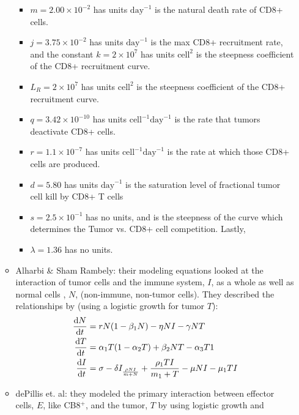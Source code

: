 \documentclass[11pt]{amsart}
\begin{document}
\begin{itemize}
\begin{itemize}
\begin{itemize}
                   		 	\item $m = 2.00 \times 10^{-2}$ has units $\text{day}^{-1}$ is the natural death rate of CD8+ cells.
                   		 	\item $j = 3.75 \times 10^{-2}$ has units $\text{day}^{-1}$ is the max CD8+ recruitment rate, and the constant $k = 2 \times 10^7$ has units $\text{cell}^2$ is the steepness coefficient of the CD8+ recruitment curve.
                   		 	\item $L_R = 2 \times 10^7$ has units $\text{cell}^2$ is the steepness coefficient of the CD8+ recruitment curve.
                   		 	\item $q = 3.42 \times 10^{-10}$ has units $\text{cell}^{-1}\text{day}^{-1}$ is the rate that tumors deactivate CD8+ cells.
                   		 	\item $r =1.1 \times 10^{-7} $ has units $\text{cell}^{-1}\text{day}^{-1}$ is the rate at which those CD8+ cells are produced. 
                    			\item $d = 5.80$ has units $\text{day}^{-1}$ is the saturation level of fractional tumor cell kill by CD8+ T cells
                    			\item $s = 2.5 \times 10^{-1}$ has no units, and is the steepness of the curve which determines the Tumor vs. CD8+ cell competition. Lastly, \item $\lambda = 1.36$ has no units. 
				\end{itemize}
			\item Alharbi \& Sham Rambely: their modeling equations looked at the interaction of tumor cells and the immune system, $I$, as a whole as well as normal cells , $N$, (non-immune, non-tumor cells). They described the relationships by (using a logistic growth for tumor $T$):
				\begin{eqnarray}
					\begin{aligned}
						\frac{\mathop{}\!\mathrm{d} N}{\mathop{}\!\mathrm{d} t} &= rN(1-\beta_1 N) - \eta NI - \gamma NT \\
						\frac{\mathop{}\!\mathrm{d} T}{\mathop{}\!\mathrm{d} t} &= \alpha_1T(1-\alpha_2T) + \beta_2 NT - \alpha_3 T1 \\
						\frac{\mathop{}\!\mathrm{d} I}{\mathop{}\!\mathrm{d} t} &= \sigma - \delta I _ \frac{\rho N I}{m+N} + \frac{\rho_1 TI}{m_1 + T} - \mu NI - \mu_1 TI \label{eq: AlharbiTumorImmuno}
					\end{aligned}
				\end{eqnarray}
			\item dePillis et. al: they modeled the primary interaction between effector cells, $E$, like CB8$^+$, and the tumor, $T$ by using logistic growth and 

\end{itemize}
\end{itemize}
\end{document}
